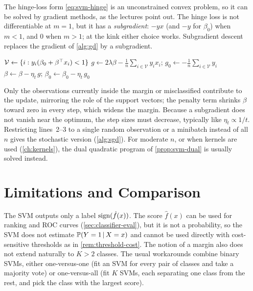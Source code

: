 The hinge-loss form \eqref{eq:svm-hinge} is an unconstrained convex problem, so it can be solved by gradient methods, as the lectures point out. The hinge loss is not differentiable at $m=1$, but it has a \emph{subgradient}: $-yx$ (and $-y$ for $\beta_0$) when $m<1$, and $0$ when $m>1$; at the kink either choice works. Subgradient descent replaces the gradient of \cref{alg:gd} by a subgradient.

\begin{algorithm}[H]
\caption{Linear SVM by Subgradient Descent}\label{alg:svm-subgradient}
\begin{algorithmic}[1]
  \State $\mathcal V\gets\{i:y_i(\beta_0+\beta^{\top} x_i)<1\}$ 
  \State $g\gets2\lambda\beta-\frac1n\sum_{i\in\mathcal V}y_ix_i$; \quad $g_0\gets-\frac1n\sum_{i\in\mathcal V}y_i$ 
  \State $\beta\gets\beta-\eta_t\,g$; \quad $\beta_0\gets\beta_0-\eta_t\,g_0$
\EndFor
{}
\end{algorithmic}
\end{algorithm}

Only the observations currently inside the margin or misclassified contribute to the update, mirroring the role of the support vectors; the penalty term shrinks $\beta$ toward zero in every step, which widens the margin. Because a subgradient does not vanish near the optimum, the step sizes must decrease, typically like $\eta_t\propto1/t$. Restricting lines~2--3 to a single random observation or a minibatch instead of all $n$ gives the stochastic version (\cref{alg:sgd}). For moderate $n$, or when kernels are used (\cref{ch:kernels}), the dual quadratic program of \cref{prop:svm-dual} is usually solved instead.

\section{Limitations and Comparison}\label{sec:svm-comparison}

The SVM outputs only a label $\operatorname{sign}(\hat f(x))$. The score $\hat f(x)$ can be used for ranking and ROC curves (\cref{sec:classifier-eval}), but it is not a probability, so the SVM does not estimate $\mathbb{P}(Y=1\,|\, X=x)$ and cannot be used directly with cost-sensitive thresholds as in \cref{rem:threshold-cost}. The notion of a margin also does not extend naturally to $K>2$ classes. The usual workarounds combine binary SVMs, either one-versus-one (fit an SVM for every pair of classes and take a majority vote) or one-versus-all (fit $K$ SVMs, each separating one class from the rest, and pick the class with the largest score).

